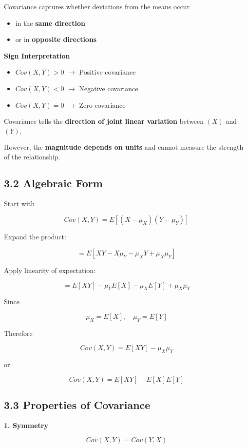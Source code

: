 \documentclass[12pt]{article}
\begin{document}
Covariance captures whether deviations from the means occur

\begin{itemize}
\item in the \textbf{same direction}
\item or in \textbf{opposite directions}
\end{itemize}

\textbf{Sign Interpretation}

\begin{itemize}
\item $Cov(X,Y) > 0$ $\rightarrow$ Positive covariance
\item $Cov(X,Y) < 0$ $\rightarrow$ Negative covariance
\item $Cov(X,Y) = 0$ $\rightarrow$ Zero covariance
\end{itemize}

Covariance tells the \textbf{direction of joint linear variation} between $(X)$ and $(Y)$.

However, the \textbf{magnitude depends on units} and cannot measure the strength of the relationship.

\subsection*{3.2 Algebraic Form}

Start with

\[
Cov(X,Y) = E[(X-\mu_X)(Y-\mu_Y)]
\]

Expand the product:

\[
=E[XY - X\mu_Y - \mu_XY + \mu_X\mu_Y]
\]

Apply linearity of expectation:

\[
=E[XY] - \mu_YE[X] - \mu_XE[Y] + \mu_X\mu_Y
\]

Since

\[
\mu_X = E[X], \quad \mu_Y = E[Y]
\]

Therefore

\[
Cov(X,Y)=E[XY]-\mu_X\mu_Y
\]

or

\[
Cov(X,Y)=E[XY]-E[X]E[Y]
\]

\subsection*{3.3 Properties of Covariance}

\textbf{1. Symmetry}

\[
Cov(X,Y)=Cov(Y,X)
\]
\end{document}
